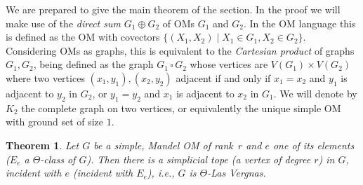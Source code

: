 \documentclass[final,11pt]{article}
\newtheorem{thm}{Theorem}[section]
\def\B{\,\square \,}
\begin{document}
We are prepared to give the main theorem of the section.
In the proof we will make use of the \emph{direct sum} $G_1 \oplus G_2$ of OMs $G_1$ and $G_2$. In the OM language this is defined as the OM with covectors $\{(X_1 , X_2) \mid X_1 \in G_1, X_2 \in G_2\}$. Considering OMs as graphs, this is equivalent to the \emph{Cartesian product} of graphs $G_1, G_2$, being defined as the graph $G_1\B G_2$ whose vertices are $V(G_1) \times V(G_2)$ where two vertices $(x_1, y_1),(x_2, y_2)$ adjacent if and only if $x_1=x_2$ and $y_1$ is adjacent to $y_2$ in $G_2$, or $y_1=y_2$ and $x_1$ is adjacent to $x_2$ in $G_1$. We will denote by $K_2$ the complete graph on two vertices, or equivalently the unique simple OM with ground set of size $1$. 

\begin{thm}\label{thm:simplical_on_theta}
Let $G$ be a simple, Mandel OM of rank~$r$ and $e$ one of its elements ($E_e$ a $\Theta$-class of $G$). Then there is a simplicial tope (a vertex of degree $r$) in $G$, incident with $e$  (incident with $E_e$), i.e., $G$ is $\Theta$-Las Vergnas.
\end{thm}
\end{document}
